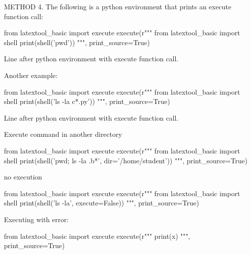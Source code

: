 METHOD 4.
The following is a python environment that prints an execute function call:
\begin{python}
from latextool_basic import execute
execute(r"""
from latextool_basic import shell
print(shell('pwd'))
""", print_source=True)
\end{python}
Line after python environment with execute function call.

Another example:
\begin{python}
from latextool_basic import execute
execute(r"""
from latextool_basic import shell
print(shell('ls -la c*.py'))
""", print_source=True)
\end{python}
Line after python environment with execute function call.

Execute command in another directory
\begin{python}
from latextool_basic import execute
execute(r"""
from latextool_basic import shell
print(shell('pwd; ls -la .b*', dir='/home/student'))
""", print_source=True)
\end{python}

no execution
\begin{python}
from latextool_basic import execute
execute(r"""
from latextool_basic import shell
print(shell('ls -la', execute=False))
""", print_source=True)
\end{python}


Executing with error:
\begin{python}
from latextool_basic import execute
execute(r"""
print(x)
""", print_source=True)
\end{python}

